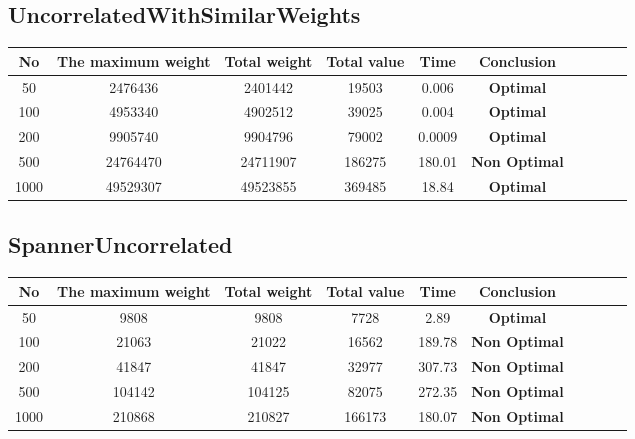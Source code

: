 \documentclass{article}
\begin{document}
\subsection{UncorrelatedWithSimilarWeights}
    \begin{center}
        \begin{tabular}{|c|c| c|c| c|c| c|c| c|c|}
        \hline
            No& The maximum weight & Total weight & Total value& Time&Conclusion \\
        \hline
            50 & 2476436 & 2401442 & 19503 & 0.006 & \textbf{Optimal}\\
            100 & 4953340 & 4902512 & 39025 & 0.004 & \textbf{Optimal}\\
            200 & 9905740 & 9904796 & 79002 & 0.0009 & \textbf{Optimal}\\
            500 & 24764470 & 24711907 & 186275 & 180.01 & \textbf{Non Optimal}\\
            1000 & 49529307 & 49523855 & 369485 & 18.84 & \textbf{Optimal}\\
    \hline
        \hline 
        \end{tabular}
    \end{center}
\subsection{SpannerUncorrelated}
    \begin{center}
        \begin{tabular}{|c|c| c|c| c|c| c|c| c|c|}
        \hline
            No& The maximum weight & Total weight & Total value& Time&Conclusion \\
        \hline
            50 & 9808 & 9808 & 7728 & 2.89 & \textbf{Optimal}\\
            100 & 21063 & 21022 & 16562 & 189.78 & \textbf{Non Optimal}\\
            200 & 41847 & 41847 & 32977 & 307.73 & \textbf{Non Optimal}\\
            500 & 104142 & 104125 & 82075 & 272.35 & \textbf{Non Optimal}\\
            1000 & 210868 & 210827 & 166173 & 180.07 & \textbf{Non Optimal}\\
    \hline
        \hline 
        \end{tabular}
    \end{center}
\end{document}
